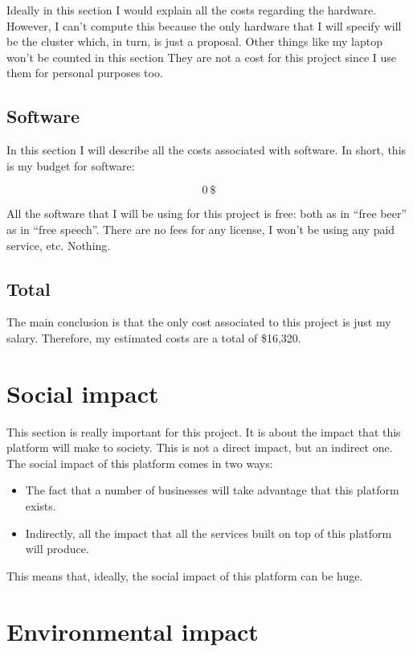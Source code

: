 \documentclass[a4paper,12pt]{article}
\newcommand{\mylist}{
\begin{itemize}
\setlength{\itemsep}{1pt}
\setlength{\parskip}{0pt}
\setlength{\parsep}{0pt}}
\newcommand{\mylistend}{\end{itemize}}
\begin{document}
Ideally in this section I would explain all the costs regarding the hardware.
However, I can't compute this because the only hardware that I will specify will
be the cluster which, in turn, is just a proposal. Other things like my laptop
won't be counted in this section They are not a cost for this project since I
use them for personal purposes too.

\subsection{Software}

In this section I will describe all the costs associated with software. In
short, this is my budget for software:

\[
  0\ \$
\]

All the software that I will be using for this project is free: both as in
``free beer'' as in ``free speech''. There are no fees for any license, I won't
be using any paid service, etc. Nothing.

\subsection{Total}

The main conclusion is that the only cost associated to this project is just my
salary. Therefore, my estimated costs are a total of \$16,320.

\section{Social impact}

This section is really important for this project. It is about the impact that
this platform will make to society. This is not a direct impact, but an
indirect one. The social impact of this platform comes in two ways:

\mylist
  \item The fact that a number of businesses will take advantage that this
platform exists.
  \item Indirectly, all the impact that all the services built on top of this
platform will produce.
\mylistend

This means that, ideally, the social impact of this platform can be huge.

\section{Environmental impact}
\end{document}
